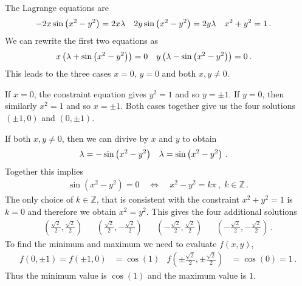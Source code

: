 \begin{solution}
The Lagrange equations are
\begin{align*}
-2x \sin\left(x^2 - y^2 \right) &= 2x\lambda &
2y \sin\left(x^2 - y^2 \right) &= 2y\lambda &
x^2 + y^2 &= 1\,.
\end{align*}
We can rewrite the first two equations as
\begin{align*}
x \left(\lambda + \sin\left(x^2 - y^2 \right)\right) &= 0 &
y \left(\lambda - \sin\left(x^2 - y^2 \right)\right) &= 0\,.
\end{align*}
This leads to the three cases $x=0$, $y=0$ and both $x,y \neq 0$.

If $x=0$, the constraint equation gives $y^2 = 1$ and so $y = \pm 1$. If $y=0$, then similarly $x^2 = 1$ and so $x = \pm 1$. Both cases together give us the four solutions $(\pm 1, 0)$ and $(0, \pm 1)$.

If both $x,y \neq 0$, then we can divive by $x$ and $y$ to obtain
\begin{align*}
\lambda &= - \sin\left(x^2 - y^2 \right) &
\lambda &=  \sin\left(x^2 - y^2 \right)\,.
\end{align*}
Together this implies
\begin{align*}
\sin\left(x^2-y^2\right) = 0\quad\Leftrightarrow\quad
x^2 - y^2 = k \pi\,,\; k \in \mathbb Z\,.
\end{align*}
The only choice of $k \in \mathbb Z$, that is consistent with the constraint $x^2 + y^2 =1$ is $k=0$ and therefore we obtain $x^2 =y^2$. This gives the four additional solutions
\begin{align*}
\left(\frac{\sqrt{2}}2, \frac{\sqrt{2}}2 \right) &&
\left(\frac{\sqrt{2}}2, -\frac{\sqrt{2}}2 \right) &&
\left(-\frac{\sqrt{2}}2, \frac{\sqrt{2}}2 \right) &&
\left(-\frac{\sqrt{2}}2, -\frac{\sqrt{2}}2 \right)\,.
\end{align*}
To find the minimum and maximum we need to evaluate $f(x,y)$,
\begin{align*}
f(0, \pm 1) = f(\pm 1, 0) &= \cos(1) &
f\left(\pm\frac{\sqrt{2}}2, \pm\frac{\sqrt{2}}2 \right) &= \cos(0) = 1\,.
\end{align*}
Thus the minimum value is $\cos(1)$ and the maximum value is $1$.
\end{solution}

